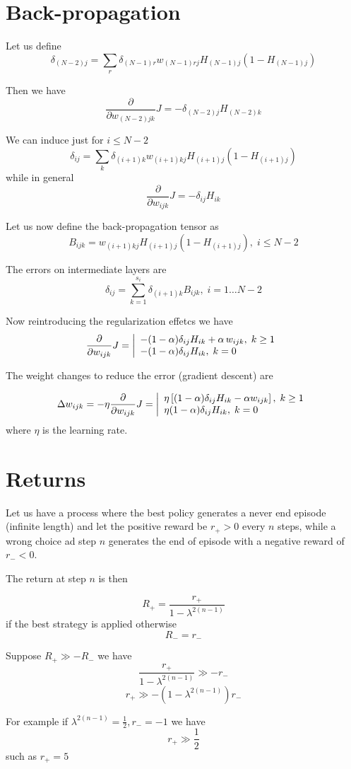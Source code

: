 \documentclass[a4paper,11pt]{article}
\begin{document}
\section{Back-propagation}

Let us define
\[
	\delta_{(N-2)j} =
	\sum_r \delta_{(N-1)r} w_{(N-1)rj} H_{(N-1)j} (1 - H_{(N-1)j})
\]

Then we have
\[
	\frac{\partial}{\partial w_{(N-2)jk}} J =
	- \delta_{(N-2)j}  H_{(N-2)k}
\]

We can induce just for $ i \le N - 2 $ 
\[
	\delta_{ij} =
	\sum_k \delta_{(i+1)k} w_{(i+1)kj} H_{(i+1)j} (1 - H_{(i+1)j})
\]
while in general
\[
	\frac{\partial}{\partial w_{ijk}} J =
	- \delta_{ij} H_{ik}
\]

Let us now define the back-propagation tensor as
\[
  B_{ijk} =  w_{(i+1)kj} H_{(i+1)j} (1 - H_{(i+1)j}), \; i \le N-2
\]

The errors on intermediate layers are
\[
  \delta_{ij} = \sum_{k=1}^{s_i} \delta_{(i+1)k} B_{ijk},\; i = 1 \dots N-2
\]

Now reintroducing the regularization effetcs we have
\[
	\frac{\partial}{\partial w_{ijk}} J =\left|
    \begin{array}l
		-(1 - \alpha) \delta_{ij} H_{ik} + \alpha \, w_{ijk}, \; k \ge 1
	      \\
		-(1 - \alpha) \delta_{ij} H_{ik}, \; k =0
    \end{array}
  \right.
\]

The weight changes to reduce the error (gradient descent) are

\[
  \Delta w_{ijk}  = -\eta \frac{\partial}{\partial w_{ijk}} J = \left|
  \begin{array}l
    \eta \left[ (1 - \alpha) \delta_{ij} H_{ik} - \alpha w_{ijk} \right], \; k \ge 1
    \\
    \eta (1 - \alpha) \delta_{ij} H_{ik}, \; k = 0
  \end{array}
  \right.
\]
where $ \eta $ is the learning rate.


\section{Returns}

Let us have a process where the best policy generates a never end episode (infinite length) and let the positive reward be $ r_+ > 0 $ every $ n $ steps, while a wrong choice ad step $ n $ generates the end of episode with a negative reward of $ r_- < 0 $.

The return at step $ n $ is then

\[ 
	R_+ = \frac{r_+}{1 - \lambda ^ {2 (n -1)}}
 \]
if the best strategy is applied otherwise 
\[ 
R_- = r_-
\]

Suppose $ R_+ \gg -R_- $ we have 
\[ 
	\frac{r_+}{1 - \lambda ^ {2 (n -1)}} \gg -r_-
\]
\[ 
	r_+ \gg -(1 - \lambda ^ {2 (n -1)}) r_-
\]

For example if $ \lambda ^ {2 (n -1)} = \frac{1}{2}, r_- = -1 $ we have 
\[ 
r_+ \gg \frac{1}{2}
\]
such as $ r_+ = 5 $
\end{document}
